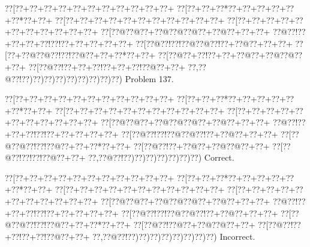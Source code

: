 \documentclass[a5paper]{article}
\begin{document}
\newpage
\begin{center}
{\goo
\0??[\0??+\0??+\0??+\0??+\0??+\0??+\0??+\0??+\0??+\0??+\0??+
\0??[\0??+\0??+\0??*\0??+\0??+\0??+\0??+\0??+\0??*\0??+\0??+
\0??[\0??+\0??+\0??+\0??+\0??+\0??+\0??+\0??+\0??+\0??+\0??+
\0??[\0??+\0??+\0??+\0??+\0??+\0??+\0??+\0??+\0??+\0??+\0??+
\0??[\0??@\0??@\0??+\0??@\0??@\0??@\0??+\0??@\0??+\0??+\0??+
\0??@\0??!\0??+\0??+\0??+\0??!\0??!\0??+\0??+\0??+\0??+\0??+
\0??[\0??@\0??!\0??!\0??@\0??@\0??!\0??+\0??@\0??+\0??+\0??+
\0??[\0??+\0??@\0??@\0??!\0??!\0??@\0??+\0??+\0??*\0??+\0??+
\0??[\0??@\0??+\0??!\0??+\0??+\0??@\0??+\0??@\0??@\0??+\0??+
\0??[\0??@\0??!\0??+\0??+\0??!\0??+\0??+\0??!\0??@\0??+\0??+
\0??,\0??@\0??!\0??)\0??)\0??)\0??)\0??)\0??)\0??)\0??)\0??)
}
Problem 137.

\end{center}
\begin{center}
{\goo
\0??[\0??+\0??+\0??+\0??+\0??+\0??+\0??+\0??+\0??+\0??+\0??+
\0??[\0??+\0??+\0??*\0??+\0??+\0??+\0??+\0??+\0??*\0??+\0??+
\0??[\0??+\0??+\0??+\0??+\0??+\0??+\0??+\0??+\0??+\0??+\0??+
\0??[\0??+\0??+\0??+\0??+\0??+\0??+\0??+\0??+\0??+\0??+\0??+
\0??[\0??@\0??@\0??+\0??@\0??@\0??@\0??+\0??@\0??+\0??+\0??+
\0??@\0??!\0??+\0??+\0??!\0??!\0??+\0??+\0??+\0??+\0??+
\0??[\0??@\0??!\0??!\0??@\0??@\0??!\0??+\0??@\0??+\0??+\0??+
\0??[\0??@\0??@\0??!\0??!\0??@\0??+\0??+\0??*\0??+\0??+
\0??[\0??@\0??!\0??+\0??@\0??+\0??@\0??@\0??+\0??+
\0??[\0??@\0??!\0??!\0??!\0??@\0??+\0??+
\0??,\0??@\0??!\0??)\0??)\0??)\0??)\0??)\0??)\0??)
}
Correct. 

\end{center}
\begin{center}
{\goo
\0??[\0??+\0??+\0??+\0??+\0??+\0??+\0??+\0??+\0??+\0??+\0??+
\0??[\0??+\0??+\0??*\0??+\0??+\0??+\0??+\0??+\0??*\0??+\0??+
\0??[\0??+\0??+\0??+\0??+\0??+\0??+\0??+\0??+\0??+\0??+\0??+
\0??[\0??+\0??+\0??+\0??+\0??+\0??+\0??+\0??+\0??+\0??+\0??+
\0??[\0??@\0??@\0??+\0??@\0??@\0??@\0??+\0??@\0??+\0??+\0??+
\0??@\0??!\0??+\0??+\0??!\0??!\0??+\0??+\0??+\0??+\0??+
\0??[\0??@\0??!\0??!\0??@\0??@\0??!\0??+\0??@\0??+\0??+\0??+
\0??[\0??@\0??@\0??!\0??!\0??@\0??+\0??+\0??*\0??+\0??+
\0??[\0??@\0??!\0??@\0??+\0??@\0??@\0??+\0??+
\0??[\0??@\0??!\0??+\0??!\0??+\0??!\0??@\0??+\0??+
\0??,\0??@\0??!\0??)\0??)\0??)\0??)\0??)\0??)\0??)\0??)
}
Incorrect. 

\end{center}
\end{document}
